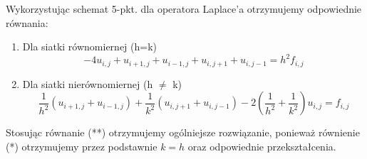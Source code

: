 Wykorzystując schemat 5-pkt. dla operatora Laplace'a otrzymujemy odpowiednie równania:\\

\begin{enumerate}
	\item Dla siatki równomiernej (h=k)
	\begin{equation}
-4u_{i,j} + u_{i+1,j} + u_{i-1,j} + u_{i,j+1} + u_{i,j-1} = h^2 f_{i,j} \tag{*}
	\end{equation}
	
	\item Dla siatki nierównomiernej (h $\neq$ k)
	\begin{equation}
		\dfrac{1}{h^2}\left(u_{i+1,j} + u_{i-1,j} \right) + \dfrac{1}{k^2} \left(u_{i,j+1} + u_{i,j-1} \right) -2\left(\dfrac{1}{h^2} + \dfrac{1}{k^2} \right)u_{i,j} = f_{i,j} \tag{**}
	\end{equation}	
\end{enumerate}
Stosując równanie (**) otrzymujemy ogólniejsze rozwiązanie, ponieważ równienie (*) otrzymujemy przez podstawnie $k=h$ oraz odpowiednie przekształcenia.
\\	

